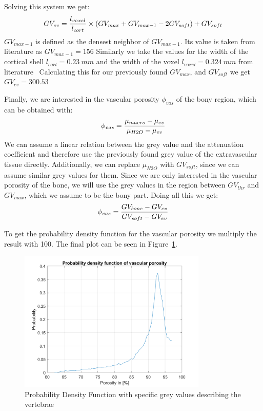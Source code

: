 \documentclass[a4paper,12pt]{article}
\begin{document}
    \vspace{10pt}
    Solving this system we get:
    \[
        GV_{ev} = \frac{{l_{voxel}}}{l_{cort}} \times (GV_{max} + GV_{max-1} - 2GV_{soft}) + GV_{soft}\\
    \]
    $GV_{max-1}$ is defined as the densest neighbor of $GV_{max-1}$.
    Its value is taken from literature as $GV_{max-1} = 156$
    Similarly we take the values for the width of the cortical shell $l_{cort} = 0.23\:mm$ and the width of the voxel $l_{voxel} = 0.324\: mm$ from literature~\cite{blanchard2016patient}
    Calculating this for our previously found $GV_{max}$, and $GV_{soft}$ we get $GV_{ev} = 300.53$

    \vspace{10pt}
    Finally, we are interested in the vascular porosity $\phi_{vas}$ of the bony region, which can be obtained with:
    \[
        \phi_{vas} = \frac{{\mu_{macro} - \mu_{ev}}}{{\mu_{H2O} - \mu_{ev}}}\\
    \]
    We can assume a linear relation between the grey value and the attenuation coefficient and therefore use the previously found grey value of the extravascular tissue directly.
    Additionally, we can replace $\mu_{H2O}$ with $GV_{soft}$, since we can assume similar grey values for them. \cite{blanchard2016patient}
    Since we are only interested in the vascular porosity of the bone, we will use the grey values in the region between $GV_{thr}$ and $GV_{max}$, which we assume to be the bony part.
    Doing all this we get:
    \[
        \phi_{vas} = \frac{{GV_{bone} - GV_{ev}}}{{GV_{soft} - GV_{ev}}}\\
    \]

    To get the probability density function for the vascular porosity we multiply the result with 100.
    The final plot can be seen in Figure~\ref{fig:vascular_porosity}.

    \begin{figure}[h]
        \centering
        \includegraphics[width=0.8\textwidth]{vascular_porosity}
        \caption{Probability Density Function with specific grey values describing the vertebrae}
        \label{fig:vascular_porosity}
    \end{figure}
\end{document}
